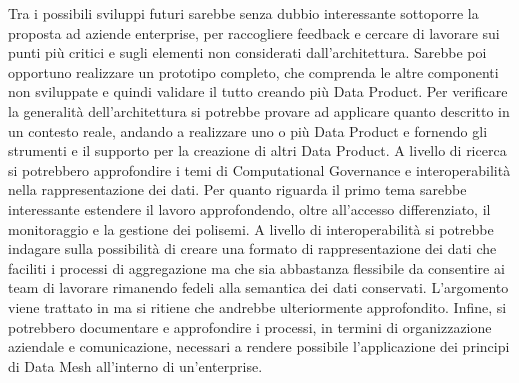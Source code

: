 \documentclass[a4paper,12pt]{report}
\begin{document}
Tra i possibili sviluppi futuri sarebbe senza dubbio interessante sottoporre la proposta ad aziende enterprise, per raccogliere feedback e cercare di lavorare sui punti più critici e sugli elementi non considerati dall'architettura.
Sarebbe poi opportuno realizzare un prototipo completo, che comprenda le altre componenti non sviluppate e quindi validare il tutto creando più Data Product.
Per verificare la generalità dell'architettura si potrebbe provare ad applicare quanto descritto in un contesto reale, andando a realizzare uno o più Data Product e fornendo gli strumenti e il supporto per la creazione di altri Data Product.
A livello di ricerca si potrebbero approfondire i temi di Computational Governance e interoperabilità nella rappresentazione dei dati.
Per quanto riguarda il primo tema sarebbe interessante estendere il lavoro approfondendo, oltre all'accesso differenziato, il monitoraggio e la gestione dei polisemi.
A livello di interoperabilità si potrebbe indagare sulla possibilità di creare una formato di rappresentazione dei dati che faciliti i processi di aggregazione ma che sia abbastanza flessibile da consentire ai team di lavorare rimanendo fedeli alla semantica dei dati conservati.
L'argomento viene trattato in \cite{dehghani_data_2022} ma si ritiene che andrebbe ulteriormente approfondito.
Infine, si potrebbero documentare e approfondire i processi, in termini di organizzazione aziendale e comunicazione, necessari a rendere possibile l'applicazione dei principi di Data Mesh all'interno di un'enterprise.
\printbibliography
\end{document}
